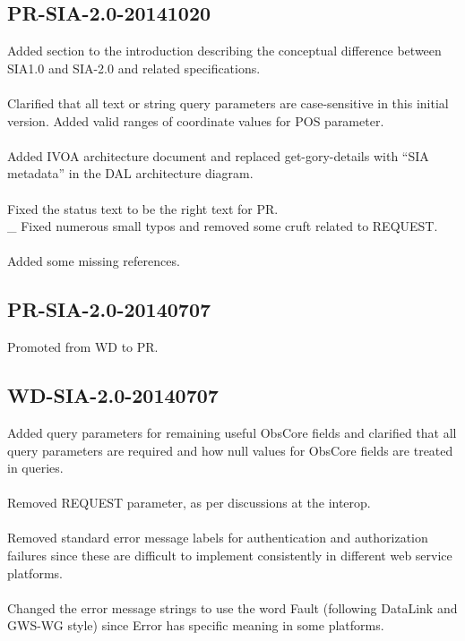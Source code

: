 \documentclass[11pt,a4paper]{ivoa}
\begin{document}
\subsection{PR-SIA-2.0-20141020}
Added section to the introduction describing the conceptual difference between SIA1.0 and SIA-2.0 and related specifications. \\ \\
Clarified that all text or string {query} parameters are case-sensitive in this initial version. Added valid ranges of coordinate values for POS parameter. \\ \\
Added IVOA architecture document and replaced get-gory-details with “SIA metadata” in the DAL architecture diagram. \\ \\
Fixed the status text to be the right text for PR. \\ \_
Fixed numerous small typos and removed some cruft related to REQUEST. \\ \\
Added some missing references.
\subsection{PR-SIA-2.0-20140707}
Promoted from WD to PR.
\subsection{WD-SIA-2.0-20140707}
Added query parameters for remaining useful ObsCore fields and clarified that all query parameters are required and how null values for ObsCore fields are treated in queries. \\ \\
Removed REQUEST parameter, as per discussions at the interop. \\ \\
Removed standard error message labels for authentication and authorization failures since these are difficult to implement consistently in different web service platforms.\\ \\
Changed the error message strings to use the word Fault (following DataLink and GWS-WG style) since Error has specific meaning in some platforms.
\end{document}
